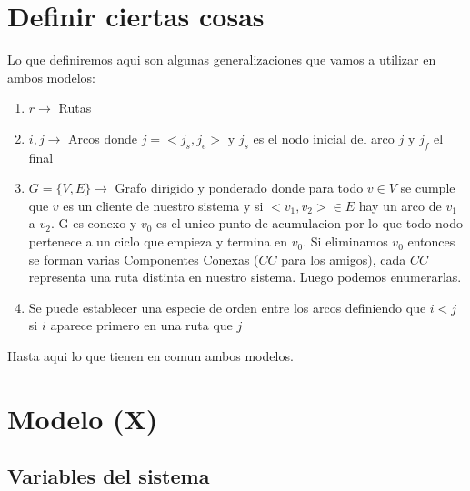 \documentclass{article}
\begin{document}
\section {Definir ciertas cosas}

Lo que definiremos aqui son algunas generalizaciones que vamos a utilizar en ambos modelos:

\begin{enumerate}
\item {$ r \rightarrow $ Rutas}

\item {$i,j \rightarrow$ Arcos donde $j=<j_s,j_e>$ y $j_s$ es el nodo inicial del arco $j$ y $j_f$ el final}

\item {$G=\{V,E\} \rightarrow$ Grafo dirigido y ponderado donde para todo $v \in V$ se cumple que $v$ es un cliente de nuestro sistema y si $<v_1,v_2> \in E$
hay un arco de $v_1$ a $v_2$. G es conexo y $v_0$ es el unico punto de acumulacion por lo que todo nodo pertenece a un ciclo que empieza y termina en $v_0$. Si eliminamos $v_0$ entonces se forman varias Componentes Conexas ($CC$ para los amigos), cada $CC$ representa una ruta distinta en nuestro sistema. Luego podemos enumerarlas.}

\item {Se puede establecer una especie de orden entre los arcos definiendo que $i<j$ si $i$ aparece primero en una ruta que $j$}

\end{enumerate}

Hasta aqui lo que tienen en comun ambos modelos.
\section {Modelo (X)}

\subsection{Variables del sistema}
\end{document}
